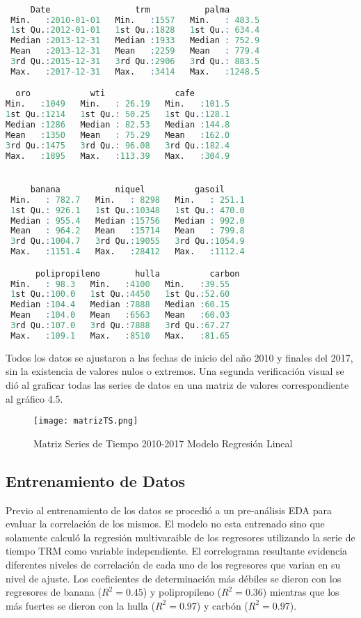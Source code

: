 \begin{lstlisting}[language=R]

     Date                 trm           palma
 Min.   :2010-01-01   Min.   :1557   Min.   : 483.5
 1st Qu.:2012-01-01   1st Qu.:1828   1st Qu.: 634.4
 Median :2013-12-31   Median :1933   Median : 752.9
 Mean   :2013-12-31   Mean   :2259   Mean   : 779.4
 3rd Qu.:2015-12-31   3rd Qu.:2906   3rd Qu.: 883.5
 Max.   :2017-12-31   Max.   :3414   Max.   :1248.5

  oro            wti              cafe
Min.   :1049   Min.   : 26.19   Min.   :101.5
1st Qu.:1214   1st Qu.: 50.25   1st Qu.:128.1
Median :1286   Median : 82.53   Median :144.8
Mean   :1350   Mean   : 75.29   Mean   :162.0
3rd Qu.:1475   3rd Qu.: 96.08   3rd Qu.:182.4
Max.   :1895   Max.   :113.39   Max.   :304.9


     banana           niquel          gasoil
 Min.   : 782.7   Min.   : 8298   Min.   : 251.1
 1st Qu.: 926.1   1st Qu.:10348   1st Qu.: 470.0
 Median : 955.4   Median :15756   Median : 992.0
 Mean   : 964.2   Mean   :15714   Mean   : 799.8
 3rd Qu.:1004.7   3rd Qu.:19055   3rd Qu.:1054.9
 Max.   :1151.4   Max.   :28412   Max.   :1112.4

      polipropileno       hulla          carbon
 Min.   : 98.3   Min.   :4100   Min.   :39.55
 1st Qu.:100.0   1st Qu.:4450   1st Qu.:52.60
 Median :104.4   Median :7888   Median :60.15
 Mean   :104.0   Mean   :6563   Mean   :60.03
 3rd Qu.:107.0   3rd Qu.:7888   3rd Qu.:67.27
 Max.   :109.1   Max.   :8510   Max.   :81.65
\end{lstlisting}

Todos los datos se ajustaron a las fechas de inicio del año 2010 y finales del 2017, sin la existencia de valores nulos o extremos. Una segunda verificación visual se dió al graficar todas las series de datos en una matriz de valores correspondiente al gráfico 4.5.

\begin{figure}[H]
    \centering
    \texttt{[image: matrizTS.png]}
    \caption{Matriz Series de Tiempo 2010-2017 Modelo Regresión Lineal}
\end{figure}

\subsection{Entrenamiento de Datos}
Previo al entrenamiento de los datos se procedió a un pre-análisis EDA para evaluar la correlación de los mismos. El modelo no esta entrenado sino que solamente calculó la regresión multivaraible de los regresores utilizando la serie de tiempo TRM como variable independiente. El correlograma resultante evidencia diferentes niveles de correlación de cada uno de los regresores que varian en su nivel de ajuste. Los coeficientes de determinación más débiles se dieron con los regresores de banana ($R^2 = 0.45$) y polipropileno ($R^2 = 0.36$) mientras que los más fuertes se dieron con la hulla ($R^2 = 0.97$) y carbón ($R^2 = 0.97$).

